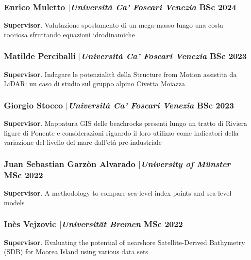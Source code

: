 \documentclass[11pt]{article}
\begin{document}
\smallskip

\subsubsection{Enrico Muletto $|${\normalfont\textit{Università Ca' Foscari Venezia}} \hfill BSc 2024}
{\footnotesize 
\textbf{Supervisor}. Valutazione spostamento di un mega-masso lungo una costa rocciosa sfruttando equazioni idrodinamiche}

\smallskip

\subsubsection{Matilde Perciballi $|${\normalfont\textit{Università Ca' Foscari Venezia}} \hfill BSc 2023}
{\footnotesize 
\textbf{Supervisor}. Indagare le potenzialità della Structure from Motion assistita da LiDAR: un caso di studio sul gruppo alpino Civetta Moiazza}

\smallskip

\subsubsection{Giorgio Stocco $|${\normalfont\textit{Università Ca' Foscari Venezia}} \hfill BSc 2023}
{\footnotesize 
\textbf{Supervisor}. Mappatura GIS delle beachrocks presenti lungo un tratto di Riviera ligure di Ponente e considerazioni riguardo il loro utilizzo come indicatori della variazione del livello del mare dall’età pre-industriale}

\smallskip

\subsubsection{Juan Sebastian Garzòn Alvarado $|${\normalfont\textit{University of Münster}} \hfill MSc 2022}
{\footnotesize 
\textbf{Supervisor}. A methodology to compare sea-level index points and sea-level models}

\smallskip

\subsubsection{Inès Vejzovic $|${\normalfont\textit{Universität Bremen}} \hfill MSc 2022}
{\footnotesize 
\textbf{Supervisor}. Evaluating the potential of nearshore Satellite-Derived Bathymetry (SDB) for Moorea Island using various data sets}

\smallskip
\end{document}
